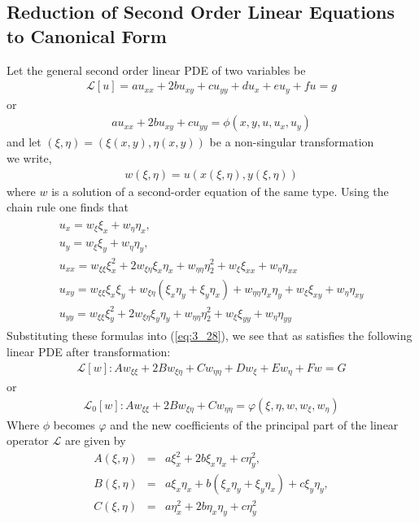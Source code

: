 \documentclass[11pt]{report}
\newcommand{\Laplace}{\mathcal{L}}
\newcommand{\sbracket}[1]{\left[#1\right]}
\newcommand{\LFn}[1]{\Laplace \sbracket{#1}}
\newcommand{\sps}{\\[0.2cm]}
\newcommand{\refn}[1]{(\ref{#1})}
\newcommand{\refx}[1]{\refn{eq:#1}}
\begin{document}
	\subsection{Reduction of Second Order Linear Equations to Canonical Form}
	Let the general second order linear PDE of two variables be
	\begin{eqnarray}
		\LFn{u} = au_{xx} + 2bu_{xy} + cu_{yy} + du_x + eu_y + fu = g\label{eq:3_28}
	\end{eqnarray}
	or
	\begin{eqnarray}
		au_{xx} + 2bu_{xy} + cu_{yy} = \phi(x,y,u,u_x,u_y)\label{eq:3_29}
	\end{eqnarray}
	and let $(\xi,\eta) = (\xi(x,y),\eta(x,y))$ be a non-singular transformation\\
	we write,
	\begin{eqnarray}
		w(\xi,\eta) = u(x(\xi,\eta),y(\xi,\eta))\label{eq:3_30}
	\end{eqnarray}
	where $w$ is a solution of a second-order equation of the same type. Using the chain rule one finds that
	\begin{eqnarray}
		 \begin{array}{l}
			u_x = w_\xi\xi_x + w_\eta\eta_x,\\
			u_y = w_\xi\xi_y + w_\eta\eta_y,\\
			u_{xx} = w_{\xi\xi}\xi^2_x + 2w_{\xi\eta}\xi_x\eta_x + w_{\eta\eta}\eta^2_2 + w_\xi\xi_{xx}+w_\eta\eta_{xx}\\
			u_{xy} = w_{\xi\xi}\xi_x\xi_y + w_{\xi\eta}(\xi_x\eta_y + \xi_y\eta_x) + w_{\eta\eta}\eta_x\eta_y + w_\xi\xi_{xy} + w_\eta\eta_{xy}\\
			u_{yy} = w_{\xi\xi}\xi^2_y + 2w_{\xi\eta}\xi_y\eta_y + w_{\eta\eta}\eta^2_2 + w_\xi\xi_{yy}+w_\eta\eta_{yy}
		\end{array}\label{eq:3_31}
	\end{eqnarray}
	Substituting these formulas into \refx{3_28}, we see that as satisfies the following linear PDE after transformation:
	\begin{eqnarray}
		\LFn{w}: Aw_{\xi\xi} + 2Bw_{\xi\eta} + Cw_{\eta\eta} + Dw_\xi + Ew_\eta + Fw = G\label{eq:3_32}
	\end{eqnarray}
	or
	\begin{eqnarray}
		\Laplace_0[w]: Aw_{\xi\xi} + 2Bw_{\xi\eta} + Cw_{\eta\eta} = \varphi(\xi,\eta,w,w_\xi,w_\eta)\label{eq:3_33}
	\end{eqnarray}
	Where $\phi$ becomes $\varphi$ and the new coefficients of the principal part of the linear operator $\Laplace$ are given by
	\begin{eqnarray*}
		A(\xi,\eta) &=& a\xi^2_x + 2b\xi_x\eta_x + c\eta^2_y,\sps
		B(\xi,\eta) &=& a\xi_x\eta_x + b(\xi_x\eta_y + \xi_y\eta_x) + c\xi_y\eta_y,\sps
		C(\xi,\eta) &=& a\eta_x^2 + 2b\eta_x\eta_y + c\eta_y^2
	\end{eqnarray*}
	
\end{document}
